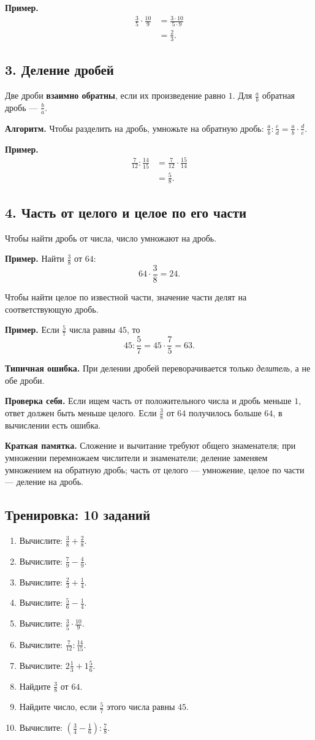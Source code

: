 \documentclass[12pt,a4paper]{article}
\newcommand{\term}[1]{\textbf{\textcolor{graphite}{#1}}}
\newcommand{\algorithm}[1]{%
  \par\smallskip
  {\color{accent}\textbf{Алгоритм.}} #1\par\smallskip
}
\newcommand{\mistake}[1]{%
  \par\smallskip
  {\color{accent}\textbf{Типичная ошибка.}} #1\par\smallskip
}
\newcommand{\selfcheck}[1]{%
  \par\smallskip
  {\color{accent}\textbf{Проверка себя.}} #1\par\smallskip
}
\newcommand{\memo}[1]{%
  \par\smallskip
  \begingroup
  \setlength{\fboxsep}{7pt}%
  \colorbox{accentlight}{\parbox{0.94\textwidth}{\textbf{Краткая памятка.} #1}}%
  \endgroup
  \par\smallskip
}
\newcommand{\trainingtitle}{\subsection*{Тренировка: 10 заданий}}
\begin{document}
\textbf{Пример.}
\begin{align*}
\frac35\cdot\frac{10}{9}
&=\frac{3\cdot10}{5\cdot9}\\
&=\frac23.
\end{align*}

\subsection*{3. Деление дробей}
Две дроби \term{взаимно обратны}, если их произведение равно $1$. Для $\frac ab$ обратная дробь --- $\frac ba$.

\algorithm{Чтобы разделить на дробь, умножьте на обратную дробь: $\frac ab:\frac cd=\frac ab\cdot\frac dc$.}

\textbf{Пример.}
\begin{align*}
\frac7{12}:\frac{14}{15}
&=\frac7{12}\cdot\frac{15}{14}\\
&=\frac58.
\end{align*}

\subsection*{4. Часть от целого и целое по его части}
Чтобы найти дробь от числа, число умножают на дробь.

\textbf{Пример.} Найти $\frac38$ от $64$:
\[
64\cdot\frac38=24.
\]

Чтобы найти целое по известной части, значение части делят на соответствующую дробь.

\textbf{Пример.} Если $\frac57$ числа равны $45$, то
\[
45:\frac57=45\cdot\frac75=63.
\]

\mistake{При делении дробей переворачивается только \emph{делитель}, а не обе дроби.}

\selfcheck{Если ищем часть от положительного числа и дробь меньше $1$, ответ должен быть меньше целого. Если $\frac38$ от $64$ получилось больше $64$, в вычислении есть ошибка.}

\memo{Сложение и вычитание требуют общего знаменателя; при умножении перемножаем числители и знаменатели; деление заменяем умножением на обратную дробь; часть от целого --- умножение, целое по части --- деление на дробь.}

\trainingtitle
\begin{enumerate}
  \item Вычислите: $\frac38+\frac28$.
  \item Вычислите: $\frac79-\frac49$.
  \item Вычислите: $\frac23+\frac14$.
  \item Вычислите: $\frac56-\frac14$.
  \item Вычислите: $\frac35\cdot\frac{10}{9}$.
  \item Вычислите: $\frac7{12}:\frac{14}{15}$.
  \item Вычислите: $2\frac13+1\frac56$.
  \item Найдите $\frac38$ от $64$.
  \item Найдите число, если $\frac57$ этого числа равны $45$.
  \item Вычислите: $\left(\frac34-\frac16\right):\frac78$.
\end{enumerate}
\end{document}
